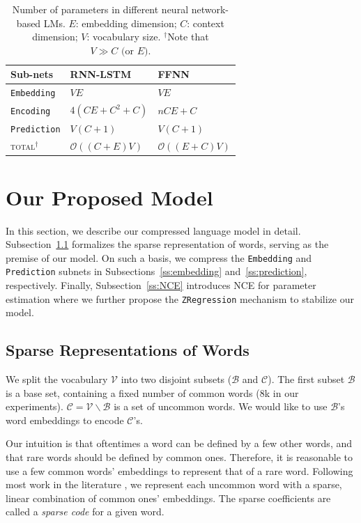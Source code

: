 \documentclass[11pt]{article}
\def\Embedding{\texttt{Embedding}}
\def\Encoding{\texttt{Encoding}}
\def\Prediction{\texttt{Prediction}}
\begin{document}
\begin{table}

\centering
\small
		\begin{tabular}{lll}
			\toprule
			Sub-nets   & RNN-LSTM              & FFNN                   \\ \midrule
			{\small \Embedding{}}  & $VE$                  & $VE$                   \\
			{\small \Encoding{}}   & $4(CE+C^2+C)$         & $nCE +C$               \\
			{\small \Prediction{}} & $V(C+1)$              & $V(C+1)$               \\
			\textsc{total}$^\dag$  & $\mathcal{O}((C+E)V)$ & $\mathcal{O}((E+C)V )$ \\ \bottomrule
		\end{tabular}
		\caption{Number of parameters in different neural network-based LMs. $E$: embedding dimension; $C$: context dimension; $V$: vocabulary size. $^\dag$Note that $V \gg C \text{ (or $E$)}$.}
		\label{tab:no.param}
\end{table}

\section{Our Proposed Model}

In this section, we describe our compressed language model in detail.
Subsection~\ref{ss:sparse} formalizes the sparse representation of words, serving as the premise of our model.
On such a basis, we compress the \Embedding{} and \Prediction{} subnets in Subsections~\ref{ss:embedding} and~\ref{ss:prediction}, respectively.
Finally, Subsection~\ref{ss:NCE} introduces NCE for parameter estimation where we further propose the \texttt{ZRegression} mechanism to stabilize our model.


\subsection{Sparse Representations of Words}\label{ss:sparse}

We split the vocabulary $\mathcal{V}$ into two disjoint
subsets ($\mathcal{B}$ and $\mathcal{C}$). The first subset $\mathcal{B}$ is a base set, containing a fixed number of common words (8k in our experiments). $\mathcal{C}=\mathcal{V}\backslash \mathcal{B}$ is a set of uncommon words. We would like to use $\mathcal{B}$'s word embeddings to encode $\mathcal{C}$'s.

Our intuition is that oftentimes a word can be defined by a few other words, and that rare words should be defined by common ones. Therefore, it is reasonable to use a few common words' embeddings to represent that of a rare word. Following most work in the literature \cite{sparse,sparse2},
we represent each uncommon word with a sparse, linear combination of common ones' embeddings.
The sparse coefficients are called a \textit{sparse code} for a given word.
\end{document}
